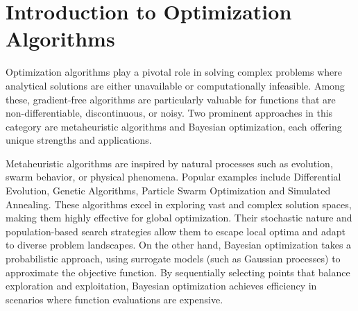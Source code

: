


\section{Introduction to Optimization Algorithms }

Optimization algorithms play a pivotal role in solving complex problems where analytical solutions are either unavailable or computationally infeasible. Among these, gradient-free algorithms are particularly valuable for functions that are non-differentiable, discontinuous, or noisy. Two prominent approaches in this category are metaheuristic algorithms and Bayesian optimization, each offering unique strengths and applications.  

Metaheuristic algorithms are inspired by natural processes such as evolution, swarm behavior, or physical phenomena. Popular examples include Differential Evolution, Genetic Algorithms, Particle Swarm Optimization and Simulated Annealing. These algorithms excel in exploring vast and complex solution spaces, making them highly effective for global optimization. Their stochastic nature and population-based search strategies allow them to escape local optima and adapt to diverse problem landscapes. On the other hand, Bayesian optimization takes a probabilistic approach, using surrogate models (such as Gaussian processes) to approximate the objective function. By sequentially selecting points that balance exploration and exploitation, Bayesian optimization achieves efficiency in scenarios where function evaluations are expensive.  

